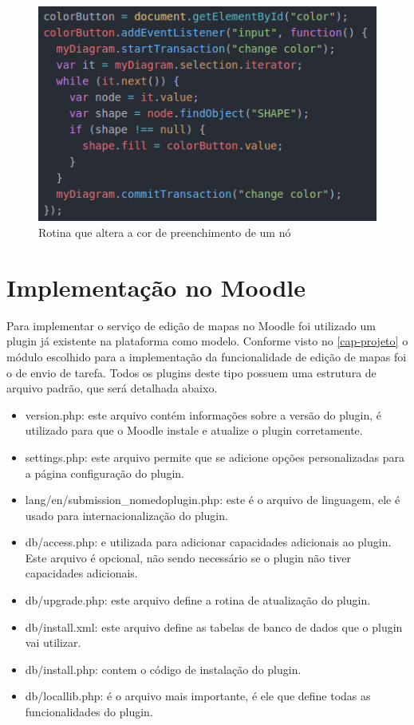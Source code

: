 \documentclass[
	12pt,				%
	openright,			%
	oneside,			%
	a4paper,			%
	english,			%
	french,				%
	spanish,			%
	brazil				%
	]{abntex2}
\begin{document}
\begin{figure}[htb]
	\caption{\label{fig_listener} Rotina que altera a cor de preenchimento de um nó}
	\begin{center}
		\includegraphics[scale=0.6]{listener.png}
	\end{center}
\end{figure}




\section{Implementação no Moodle} 
Para implementar o serviço de edição de mapas no Moodle foi utilizado um plugin já existente na plataforma como modelo. Conforme visto no \autoref{cap-projeto} o módulo escolhido para a implementação da funcionalidade de edição de mapas foi o de envio de tarefa. Todos os plugins deste tipo possuem uma estrutura de arquivo padrão, que será detalhada abaixo.
\begin{itemize}
	\item version.php: este arquivo contém informações sobre a versão do plugin, é utilizado para que o Moodle instale e atualize o plugin corretamente.
	\item settings.php: este arquivo permite que se adicione opções personalizadas para a página configuração do plugin.
	\item lang/en/submission\_nomedoplugin.php:  este é o arquivo de linguagem, ele é usado para internacionalização do plugin.
	\item db/access.php: e utilizada para adicionar capacidades adicionais ao plugin. Este arquivo é opcional, não sendo necessário se o plugin não tiver capacidades adicionais.
	\item db/upgrade.php: este arquivo define a rotina de atualização do plugin. 
	\item db/install.xml: este arquivo define as tabelas de banco de dados que o plugin vai utilizar. 
	\item db/install.php: contem o código de instalação do plugin.
	\item db/locallib.php: é o arquivo mais importante, é ele que define todas as funcionalidades do plugin.    
\end{itemize} 
\end{document}
